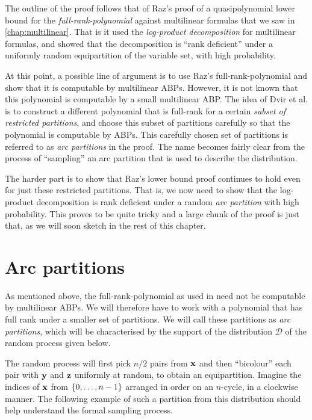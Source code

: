 The outline of the proof follows that of Raz's proof \cite{raz2004} of a quasipolynomial lower bound for the \emph{full-rank-polynomial} against multilinear formulas that we saw in \autoref{chap:multilinear}. That is it used the \emph{log-product decomposition} for multilinear formulas, and showed that the decomposition is ``rank deficient'' under a uniformly random equipartition of the variable set, with high probability.

At this point, a possible line of argument is to use Raz's full-rank-polynomial and show that it is computable by multilinear ABPs.
However, it is not known that this polynomial is computable by a small multilinear ABP.
The idea of Dvir et al. is to construct a different polynomial that is full-rank for a certain \emph{subset of restricted partitions}, and choose this subset of partitions carefully so that the polynomial is computable by ABPs.
This carefully chosen set of partitions is referred to as \emph{arc partitions} in the proof.
The name becomes fairly clear from the process of ``sampling'' an arc partition that is  used to describe the distribution.

The harder part is to show that Raz's lower bound proof continues to hold even for just these restricted partitions. That is, we now need to show that the log-product decomposition is rank deficient under a random \emph{arc partition} with high probability. This proves to be quite tricky and a large chunk of the proof is just that, as we will soon sketch in the rest of this chapter. 

\section{Arc partitions}

As mentioned above, the full-rank-polynomial as used in \cite{raz2004} need not be computable by multilinear ABPs. We will therefore have to work with a polynomial that has full rank under a smaller set of partitions. We will call these partitions as \emph{arc partitions}, which will be characterised by the support of the distribution $\mathcal{D}$ of the random process given below.

The random process will first pick $n/2$ pairs from $\mathbf{x}$ and then ``bicolour'' each pair with $\mathbf{y}$ and $\mathbf{z}$ uniformly at random, to obtain an equipartition. Imagine the indices of $\mathbf{x}$ from $\left\{0,\ldots,n-1\right\}$ arranged in order on an $n$-cycle, in a clockwise manner. The following example of such a partition from this distribution should help understand the formal sampling process. 

